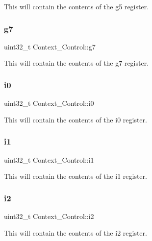 This will contain the contents of the g5 register. \mbox{\label{structContext__Control_a20c1eb3738fc011cc293a52cf16bc4ab}} 
\subsubsection{\texorpdfstring{g7}{g7}}
{\footnotesize\ttfamily uint32\+\_\+t Context\+\_\+\+Control\+::g7}

This will contain the contents of the g7 register. \mbox{\label{structContext__Control_a5239a989f4083a6bffbc3ce4084d27cd}} 
\subsubsection{\texorpdfstring{i0}{i0}}
{\footnotesize\ttfamily uint32\+\_\+t Context\+\_\+\+Control\+::i0}

This will contain the contents of the i0 register. \mbox{\label{structContext__Control_a8d5100a89d8b05e48e730cee429a9f09}} 
\subsubsection{\texorpdfstring{i1}{i1}}
{\footnotesize\ttfamily uint32\+\_\+t Context\+\_\+\+Control\+::i1}

This will contain the contents of the i1 register. \mbox{\label{structContext__Control_a8753905631bfebe52dccc00ff8419bc5}} 
\subsubsection{\texorpdfstring{i2}{i2}}
{\footnotesize\ttfamily uint32\+\_\+t Context\+\_\+\+Control\+::i2}

This will contain the contents of the i2 register. \mbox{\label{structContext__Control_a1a271b3dadd15cc8eb157f7495761c01}} 
